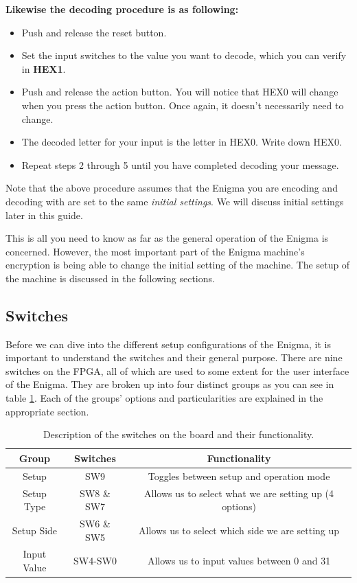 \documentclass{article}
\begin{document}
\textbf{Likewise the decoding procedure is as following: }

\begin{itemize}
    \item Push and release the reset button.
    \item Set the input switches to the value you want to decode, which you can verify in \textbf{HEX1}.
    \item Push and release the action button. You will notice that HEX0 will change when you press the action button. Once again, it doesn't necessarily need to change. 
    \item The decoded letter for your input is the letter in HEX0. Write down HEX0. 
    \item Repeat steps 2 through 5 until you have completed decoding your message. 
\end{itemize}

Note that the above procedure assumes that the Enigma you are encoding and decoding with are set to the same \textit{initial settings}. We will discuss initial settings later in this guide. 

This is all you need to know as far as the general operation of the Enigma is concerned. However, the most important part of the Enigma machine's encryption is being able to change the initial setting of the machine. The setup of the machine is discussed in the following sections. 

\subsection{Switches} \label{switches}
Before we can dive into the different setup configurations of the Enigma, it is important to understand the switches and their general purpose. There are nine switches on the FPGA, all of which are used to some extent for the user interface of the Enigma. They are broken up into four distinct groups as you can see in table \ref{tab:gen_switch_func}. Each of the groups' options and particularities are explained in the appropriate section. 

\begin{table}[ht!]
    \centering
    \begin{tabular}{|c|c|c|}
        \hline
        Group & Switches & Functionality \\
        \hline \hline
        Setup& \small{SW9} & \footnotesize{Toggles between setup and operation mode} \\
        \hline
        Setup Type & \small{SW8 \& SW7} & \footnotesize{Allows us to select what we are setting up (4 options)} \\
        \hline
        Setup Side & \small{SW6 \& SW5} & \footnotesize{Allows us to select which side we are setting up} \\
        \hline
        Input Value & \small{SW4-SW0} & \footnotesize{Allows us to input values between 0 and 31} \\
        \hline
    \end{tabular}
    \caption{Description of the switches on the board and their functionality.}
    \label{tab:gen_switch_func}
\end{table}
\end{document}
